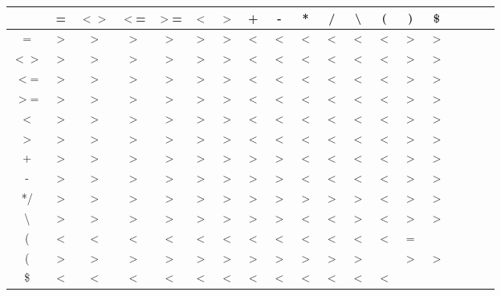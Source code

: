 \documentclass{article}
\begin{document}
        \begin{center}
        \begin{tabular}{|c||c|c|c|c|c|c|c|c|c|c|c|c|c|c|c|c|c|c|}
        \hline
                    &  =  & $<>$ & $<$= & $>$= & $<$ & $>$ &  +  &  -  &  *   &  /  & \textbackslash &  (  &  )  & \$  \\ 
        \hline
        \hline  
           =        & $>$ &  $>$ &  $>$ &  $>$ & $>$ & $>$ & $<$ & $<$ &  $<$ & $<$ & $<$            & $<$ & $>$ & $>$ \\ 
        \hline  
          $<>$      & $>$ &  $>$ &  $>$ &  $>$ & $>$ & $>$ & $<$ & $<$ &  $<$ & $<$ & $<$            & $<$ & $>$ & $>$ \\
        \hline  
          $<$=      & $>$ &  $>$ &  $>$ &  $>$ & $>$ & $>$ & $<$ & $<$ &  $<$ & $<$ & $<$            & $<$ & $>$ & $>$ \\
        \hline  
          $>$=      & $>$ &  $>$ &  $>$ &  $>$ & $>$ & $>$ & $<$ & $<$ &  $<$ & $<$ & $<$            & $<$ & $>$ & $>$ \\
        \hline  
          $<$       & $>$ &  $>$ &  $>$ &  $>$ & $>$ & $>$ & $<$ & $<$ &  $<$ & $<$ & $<$            & $<$ & $>$ & $>$ \\
        \hline        
          $>$       & $>$ &  $>$ &  $>$ &  $>$ & $>$ & $>$ & $<$ & $<$ &  $<$ & $<$ & $<$            & $<$ & $>$ & $>$ \\
        \hline  
           +        & $>$ &  $>$ &  $>$ &  $>$ & $>$ & $>$ & $>$ & $>$ &  $<$ & $<$ & $<$            & $<$ & $>$ & $>$ \\
        \hline  
           -        & $>$ &  $>$ &  $>$ &  $>$ & $>$ & $>$ & $>$ & $>$ &  $<$ & $<$ & $<$            & $<$ & $>$ & $>$ \\ 
        \hline  
          */        & $>$ &  $>$ &  $>$ &  $>$ & $>$ & $>$ & $>$ & $>$ &  $>$ & $>$ & $>$            & $<$ & $>$ & $>$ \\ 
        \hline  
\textbackslash      & $>$ &  $>$ &  $>$ &  $>$ & $>$ & $>$ & $>$ & $>$ &  $<$ & $<$ & $>$            & $<$ & $>$ & $>$ \\
        \hline  
           (        & $<$ &  $<$ &  $<$ &  $<$ & $<$ & $<$ & $<$ & $<$ &  $<$ & $<$ & $<$            & $<$ &  =  &     \\  
        \hline  
           (        & $>$ &  $>$ &  $>$ &  $>$ & $>$ & $>$ & $>$ & $>$ &  $>$ & $>$ & $>$            &     & $>$ & $>$ \\ 
        \hline  
          \$        & $<$ &  $<$ &  $<$ &  $<$ & $<$ & $<$ & $<$ & $<$ &  $<$ & $<$ &  $<$            & $<$ &     &     \\ 
        \hline  
        \end{tabular}
    \end{center}
\end{document}
